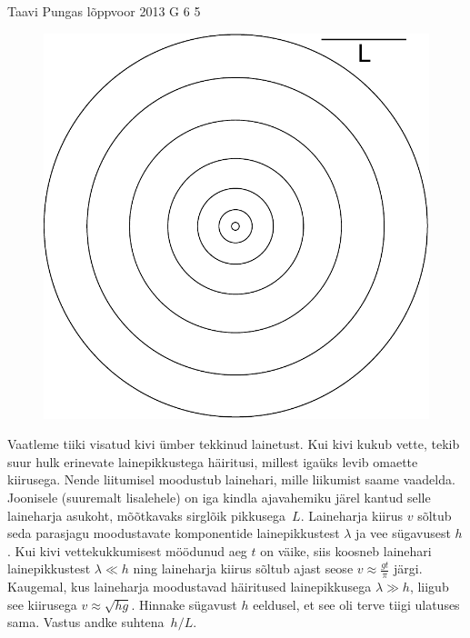 \documentclass[11pt, twoside]{article}
\begin{document}
{%
{Taavi Pungas} %
{lõppvoor} %
{2013} %
{G 6} %
{5} %
{
\ifStatement
\begin{figure}%
\includegraphics[width=\linewidth]{2013-v3g-06-lained}%
\end{figure}
Vaatleme tiiki visatud kivi ümber tekkinud lainetust. Kui kivi kukub vette,
tekib suur hulk erinevate lainepikkustega häiritusi, millest igaüks levib
omaette kiirusega. Nende liitumisel moodustub lainehari, mille liikumist
saame vaadelda. Joonisele (suuremalt lisalehele) on iga kindla ajavahemiku järel kantud selle
laineharja asukoht, mõõtkavaks sirglõik pikkusega~$L$. Laineharja kiirus $v$
sõltub seda parasjagu moodustavate komponentide lainepikkustest $\lambda$ ja vee
sügavusest $h$. Kui kivi vettekukkumisest möödunud aeg $t$ on väike, siis
koosneb lainehari lainepikkustest $\lambda \ll h$ ning laineharja kiirus sõltub
ajast seose $v \approx \frac{gt}{\pi}$ järgi. Kaugemal, kus laineharja
moodustavad häiritused lainepikkusega $\lambda \gg h$, liigub see kiirusega $v
\approx \sqrt{hg}$. Hinnake sügavust $h$ eeldusel, et see oli terve tiigi
ulatuses sama. Vastus andke suhtena~$h/L$.
\fi
}

}
\end{document}
